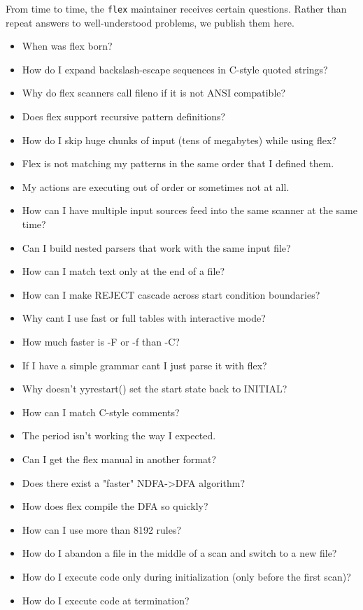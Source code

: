 \documentclass[openany,oneside]{book}
\begin{document}
From time to time, the \verb`flex` maintainer receives certain
questions. Rather than repeat answers to well-understood problems, we
publish them here.
\begin{itemize}
\item When was flex born?
\item How do I expand backslash-escape sequences in C-style quoted strings?
\item Why do flex scanners call fileno if it is not ANSI compatible?
\item Does flex support recursive pattern definitions?
\item How do I skip huge chunks of input (tens of megabytes) while using flex?
\item Flex is not matching my patterns in the same order that I defined them.
\item My actions are executing out of order or sometimes not at all.
\item How can I have multiple input sources feed into the same scanner at the same time?
\item Can I build nested parsers that work with the same input file?
\item How can I match text only at the end of a file?
\item How can I make REJECT cascade across start condition boundaries?
\item Why cant I use fast or full tables with interactive mode?
\item How much faster is -F or -f than -C?
\item If I have a simple grammar cant I just parse it with flex?
\item Why doesn't yyrestart() set the start state back to INITIAL?
\item How can I match C-style comments?
\item The period isn't working the way I expected.
\item Can I get the flex manual in another format?
\item Does there exist a "faster" NDFA->DFA algorithm?
\item How does flex compile the DFA so quickly?
\item How can I use more than 8192 rules?
\item How do I abandon a file in the middle of a scan and switch to a new file?
\item How do I execute code only during initialization (only before the first scan)?
\item How do I execute code at termination?

\end{itemize}
\end{document}
